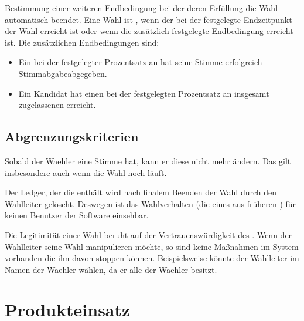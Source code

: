 \documentclass[parskip=full,11pt,twoside]{scrartcl}
\begin{document}
Bestimmung einer weiteren Endbedingung bei der  deren Erfüllung die \gls{Wahl} automatisch beendet.
Eine Wahl ist , wenn der bei der  festgelegte Endzeitpunkt der Wahl erreicht ist oder wenn die zusätzlich festgelegte Endbedingung erreicht ist.
Die zusätzlichen Endbedingungen sind:\\
\begin{itemize}
	\item Ein bei der  festgelegter Prozentsatz an  hat seine Stimme erfolgreich \gls{Stimmabgabe}{abgegeben}.\\
	\item Ein \gls{Kandidat} hat einen bei der  festgelegten Prozentsatz an insgesamt zugelassenen  erreicht.
\end{itemize}

\subsection{Abgrenzungskriterien}
Sobald der \gls{Waehler} eine Stimme  hat, kann er diese nicht mehr ändern. Das gilt insbesondere auch wenn die \gls{Wahl} noch läuft.

Der \gls{Ledger}, der die  enthält wird nach finalem Beenden der \gls{Wahl} durch den \gls{Wahlleiter} gelöscht.
Deswegen ist das Wahlverhalten (die  eines  aus früheren ) für keinen Benutzer der Software einsehbar. 

Die Legitimität einer \gls{Wahl} beruht auf der Vertrauenswürdigkeit des . Wenn der \gls{Wahlleiter} seine \gls{Wahl} manipulieren möchte, so sind keine Maßnahmen im System vorhanden die ihn davon stoppen können. Beispielsweise könnte der \gls{Wahlleiter} im Namen der \gls{Waehler} wählen, da er alle  der \gls{Waehler} besitzt.

\section{Produkteinsatz}
\end{document}
